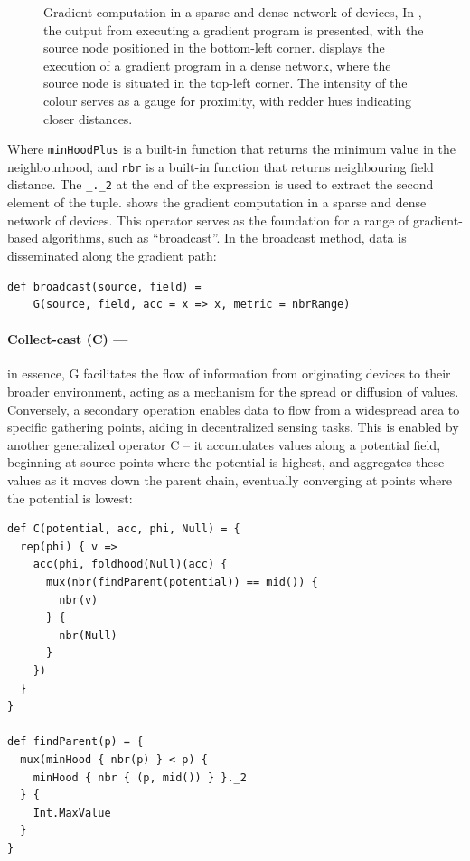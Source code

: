 \begin{figure}
\begin{subfigure}{0.4\textwidth}
        \caption{}\label{fig:gradient-full}
    \end{subfigure}
    \caption{Gradient computation in a sparse and dense network of devices, In , the output from executing a gradient program is presented, with the source node positioned in the bottom-left corner. 
     displays the execution of a gradient program in a dense network, where the source node is situated in the top-left corner. The intensity of the colour serves as a gauge for proximity, with redder hues indicating closer distances.}\label{fig:gradient-computation}
\end{figure}

Where \texttt{minHoodPlus} is a built-in function that returns the minimum value in the neighbourhood, 
 and \texttt{nbr} is a built-in function that returns neighbouring field distance.
 The \lstinline|_._2| at the end of the expression is used to extract the second element of the tuple.
 shows the gradient computation in a sparse and dense network of devices.
This operator serves as the foundation for a range of gradient-based algorithms, 
 such as ``broadcast''. 
 In the broadcast method, data is disseminated along the gradient path:
\begin{lstlisting}
def broadcast(source, field) =
    G(source, field, acc = x => x, metric = nbrRange)
\end{lstlisting}
\paragraph*{Collect-cast (C) --- }
in essence, G facilitates the flow of information from originating devices to their broader environment, 
 acting as a mechanism for the spread or diffusion of values. 
 Conversely, a secondary operation enables data to flow from a widespread area to specific gathering points, 
 aiding in decentralized sensing tasks. 
 This is enabled by another generalized operator C -- 
 it accumulates values along a potential field, beginning at source points where the potential is highest, and aggregates these values as it moves down the parent chain, 
 eventually converging at points where the potential is lowest:
\begin{lstlisting}[language=scafi]
def C(potential, acc, phi, Null) = {
  rep(phi) { v =>
    acc(phi, foldhood(Null)(acc) {
      mux(nbr(findParent(potential)) == mid()) {
        nbr(v)
      } { 
        nbr(Null)
      }
    })
  }
}

def findParent(p) = {
  mux(minHood { nbr(p) } < p) {
    minHood { nbr { (p, mid()) } }._2
  } { 
    Int.MaxValue 
  }
}
\end{lstlisting}
